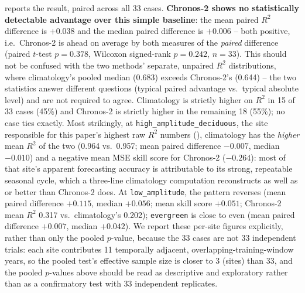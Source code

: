 \documentclass[11pt]{article}
\begin{document}
 reports the result, paired across all 33 cases. \textbf{Chronos-2 shows no
statistically detectable advantage over this simple baseline}: the mean paired $R^2$ difference is
$+0.038$ and the median paired difference is $+0.006$ -- both positive, i.e.\ Chronos-2 is ahead on
average by both measures of the \emph{paired} difference (paired $t$-test $p=0.378$, Wilcoxon
signed-rank $p=0.242$, $n=33$). This should not be confused with the two methods' separate,
unpaired $R^2$ distributions, where climatology's pooled median (0.683) exceeds Chronos-2's (0.644)
-- the two statistics answer different questions (typical paired advantage vs.\ typical absolute
level) and are not required to agree. Climatology is strictly higher on $R^2$ in 15 of 33 cases
(45\%) and Chronos-2 is strictly higher in the remaining 18 (55\%); no case ties exactly. Most
strikingly, at \texttt{high\_amplitude\_deciduous}, the site responsible for this paper's highest
raw $R^2$ numbers (), climatology has the \emph{higher} mean $R^2$ of the
two (0.964 vs.\ 0.957; mean paired difference $-0.007$, median $-0.010$) and a negative mean MSE
skill score for Chronos-2 ($-0.264$): most of that site's apparent forecasting accuracy is
attributable to its strong, repeatable seasonal cycle, which a three-line climatology computation
reconstructs as well as or better than Chronos-2 does. At \texttt{low\_amplitude}, the pattern
reverses (mean paired difference $+0.115$, median $+0.056$; mean skill score $+0.051$; Chronos-2
mean $R^2$ 0.317 vs.\ climatology's 0.202); \texttt{evergreen} is close to even (mean paired
difference $+0.007$, median $+0.042$). We report these per-site figures explicitly, rather than
only the pooled $p$-value, because the 33 cases are not 33 independent trials: each site
contributes 11 temporally adjacent, overlapping-training-window years, so the pooled test's
effective sample size is closer to 3 (sites) than 33, and the pooled $p$-values above should be
read as descriptive and exploratory rather than as a confirmatory test with 33 independent
replicates.
\end{document}
